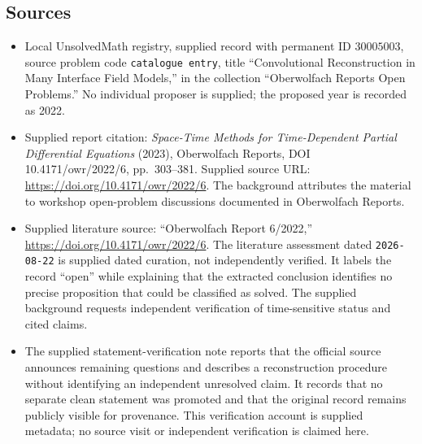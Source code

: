 \documentclass[11pt]{article}
\begin{document}
\subsection{Sources}
\begin{itemize}
\item Local UnsolvedMath registry, supplied record with permanent ID \(30005003\), source problem code \texttt{catalogue entry}, title ``Convolutional Reconstruction in Many Interface Field Models,'' in the collection ``Oberwolfach Reports Open Problems.'' No individual proposer is supplied; the proposed year is recorded as 2022.
\item Supplied report citation: \emph{Space-Time Methods for Time-Dependent Partial Differential Equations} (2023), Oberwolfach Reports, DOI 10.4171/owr/2022/6, pp.~303--381. Supplied source URL: \url{https://doi.org/10.4171/owr/2022/6}. The background attributes the material to workshop open-problem discussions documented in Oberwolfach Reports.
\item Supplied literature source: ``Oberwolfach Report 6/2022,'' \url{https://doi.org/10.4171/owr/2022/6}. The literature assessment dated \texttt{2026-08-22} is supplied dated curation, not independently verified. It labels the record ``open'' while explaining that the extracted conclusion identifies no precise proposition that could be classified as solved. The supplied background requests independent verification of time-sensitive status and cited claims.
\item The supplied statement-verification note reports that the official source announces remaining questions and describes a reconstruction procedure without identifying an independent unresolved claim. It records that no separate clean statement was promoted and that the original record remains publicly visible for provenance. This verification account is supplied metadata; no source visit or independent verification is claimed here.
\end{itemize}
\end{document}
